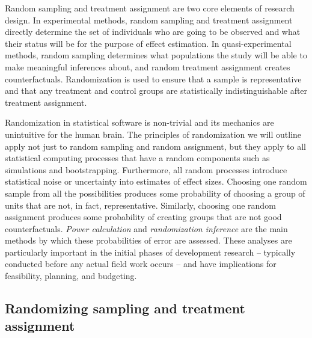 Random sampling and treatment assignment are two core elements of research design.
In experimental methods, random sampling and treatment assignment directly determine
the set of individuals who are going to be observed
and what their status will be for the purpose of effect estimation.
In quasi-experimental methods, random sampling determines what populations the study
will be able to make meaningful inferences about,
and random treatment assignment creates counterfactuals.
Randomization 
is used to ensure that a sample is representative and
that any treatment and control groups are statistically indistinguishable
after treatment assignment.

Randomization in statistical software is non-trivial
and its mechanics are unintuitive for the human brain.
The principles of randomization we will outline
apply not just to random sampling and random assignment,
but they apply to all statistical computing processes that have a random components
such as simulations and bootstrapping.
Furthermore, all random processes introduce statistical noise
or uncertainty into estimates of effect sizes.
Choosing one random sample from all the possibilities produces some probability of
choosing a group of units that are not, in fact, representative.
Similarly, choosing one random assignment produces some probability of
creating groups that are not good counterfactuals.
\textit{Power calculation} and \textit{randomization inference}
are the main methods by which these probabilities of error are assessed.
These analyses are particularly important in the initial phases of development research --
typically conducted before any actual field work occurs --
and have implications for feasibility, planning, and budgeting.

\subsection{Randomizing sampling and treatment assignment}

